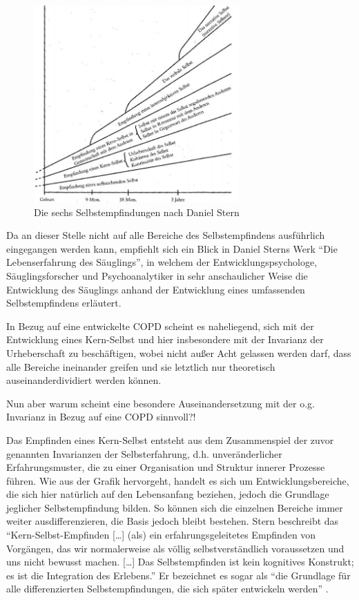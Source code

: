 \begin{figure}
 \centering
  \includegraphics[width=0.7\textwidth]{selbstempfindungen}
  \caption{Die sechs Selbstempfindungen nach Daniel Stern}
  \label{fig:selbstempfindungen}
\end{figure}

Da an dieser Stelle nicht auf alle Bereiche des Selbstempfindens ausführlich eingegangen werden kann, empfiehlt sich ein Blick in Daniel Sterns Werk "`Die Lebenserfahrung des Säuglings"', in welchem der Entwicklungspsychologe, Säuglingsforscher und Psychoanalytiker in sehr anschaulicher Weise die Entwicklung des Säuglings anhand der Entwicklung eines umfassenden Selbstempfindens erläutert.

In Bezug auf eine entwickelte COPD scheint es naheliegend, sich mit der Entwicklung eines Kern-Selbst und hier insbesondere mit der Invarianz der Urheberschaft zu beschäftigen, wobei nicht außer Acht gelassen werden darf, dass alle Bereiche ineinander greifen und sie letztlich nur theoretisch auseinanderdividiert werden können.

Nun aber warum scheint eine besondere Auseinandersetzung mit der o.g. Invarianz in Bezug auf eine COPD sinnvoll?!

Das Empfinden eines Kern-Selbst entsteht aus dem Zusammenspiel der zuvor genannten Invarianzen der Selbsterfahrung, d.h. unveränderlicher Erfahrungsmuster, die zu einer Organisation und Struktur innerer Prozesse führen. Wie aus der Grafik hervorgeht, handelt es sich um Entwicklungsbereiche, die sich hier natürlich auf den Lebensanfang beziehen, jedoch die Grundlage jeglicher Selbstempfindung bilden. So können sich die einzelnen Bereiche immer weiter ausdifferenzieren, die Basis jedoch bleibt bestehen. 
Stern beschreibt das "`Kern-Selbst-Empfinden […] (als) ein erfahrungsgeleitetes Empfinden von Vorgängen, das wir normalerweise als völlig selbstverständlich voraussetzen und uns nicht bewusst machen. […] Das Selbstempfinden ist kein kognitives Konstrukt; es ist die Integration des Erlebens."' \autocite[106f.]{stern2007} Er bezeichnet es sogar als "`die Grundlage für alle differenzierten Selbstempfindungen, die sich später entwickeln werden"' \autocite[106f.]{stern2007}. 

